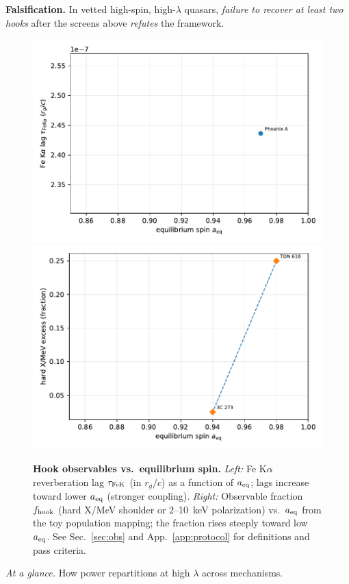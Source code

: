 \documentclass[twocolumn]{aastex701}
\begin{document}
\noindent\textbf{Falsification.}
In vetted high-spin, high-$\lambda$ quasars, \emph{failure to recover at least two hooks} after the screens above \emph{refutes} the framework.
\begin{figure}[t!]
  \vspace*{2pt}
  \centering
  \includegraphics[width=.49\columnwidth]{Fig5a.pdf}
  \hfill
  \includegraphics[width=.49\columnwidth]{Fig5b.pdf}
  \caption{\textbf{Hook observables vs.\ equilibrium spin.}
  \emph{Left:} Fe K$\alpha$ reverberation lag $\tau_{\rm FeK}$ (in $r_g/c$) as a function of $a_{\rm eq}$; lags increase toward lower $a_{\rm eq}$ (stronger coupling).
  \emph{Right:} Observable fraction $f_{\rm hook}$ (hard X/MeV shoulder or 2--10~keV polarization) vs.\ $a_{\rm eq}$ from the toy population mapping; the fraction rises steeply toward low $a_{\rm eq}$.
  See Sec.~\ref{sec:obs} and App.~\ref{app:protocol} for definitions and pass criteria.}
  \label{fig:fig5}
\end{figure}

\noindent\textit{At a glance.} How power repartitions at high $\lambda$ across mechanisms.
\end{document}
